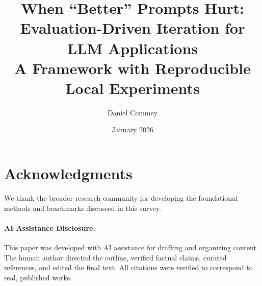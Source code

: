 \documentclass[11pt,a4paper]{article}
\title{%
  \textbf{When ``Better'' Prompts Hurt:}\\[0.5em]
  \Large Evaluation-Driven Iteration for LLM Applications\\[1em]
  \large A Framework with Reproducible Local Experiments
}
\author{%
  Daniel Commey
}
\date{January 2026}
\begin{document}
\maketitle



\tableofcontents
\newpage




















\section*{Acknowledgments}

We thank the broader research community for developing the foundational methods and benchmarks discussed in this survey.

\paragraph{AI Assistance Disclosure.}
This paper was developed with AI assistance for drafting and organizing content. The human author directed the outline, verified factual claims, curated references, and edited the final text. All citations were verified to correspond to real, published works.

\newpage


\newpage

\end{document}
